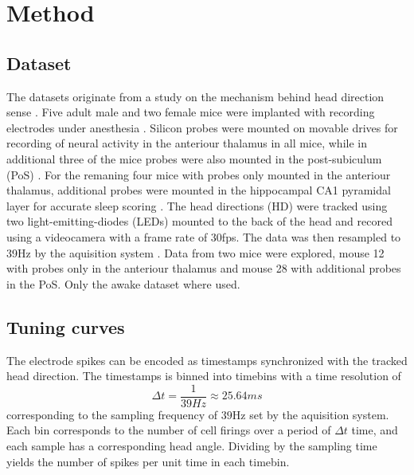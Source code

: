 \section{Method}

\subsection{Dataset}
The datasets originate from a study on the mechanism behind head direction sense \cite{projectdata}.
Five adult male and two female mice were implanted with recording electrodes under anesthesia \cite{projectdata}.
Silicon probes were mounted on movable drives for recording of neural activity in the anteriour thalamus in all mice, while in additional three of the mice probes were also mounted in the post-subiculum (PoS) \cite{projectdata}. For the remaning four mice with probes only mounted in the anteriour thalamus, additional probes were mounted in the hippocampal CA1 pyramidal layer for accurate sleep scoring \cite{projectdata}.
The head directions (HD) were tracked using two light-emitting-diodes (LEDs) mounted to the back of the head and recored using a videocamera with a frame rate of 30fps. The data was then resampled to 39Hz by the aquisition system \cite{projectdata}.
Data from two mice were explored, mouse 12 with probes only in the anteriour thalamus and mouse 28 with additional probes in the PoS. Only the awake dataset where used.
\subsection{Tuning curves}
The electrode spikes can be encoded as timestamps synchronized with the tracked head direction. The timestamps is binned into timebins with a time resolution of 
$$\Delta t = \frac{1}{39Hz} \approx 25.64ms$$ 
corresponding to the sampling frequency of $39$Hz set by the aquisition system.
Each bin corresponds to the number of cell firings over a period of $\Delta t$ time, and each sample has a corresponding head angle.
Dividing by the sampling time yields the number of spikes per unit time in each timebin.

